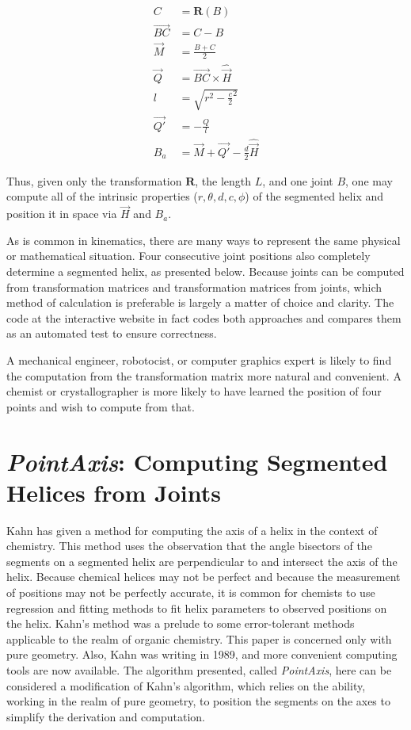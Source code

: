 \documentclass[11pt]{article}
\begin{document}
{\begin{align}
  C &= \bm{R}(B) \\
  \overrightarrow{BC} &= C - B\\
  \overrightarrow{M} &= \frac{B + C}{2} \\
  \overrightarrow{Q} &= \overrightarrow{BC} \times \hat{\overrightarrow{H}} \\
  l &= \sqrt{r^2 - \frac{c}{2}^2} \\
  \overrightarrow{Q'} &= -\frac{Q}{l} \\
  B_a &= \overrightarrow{M} + \overrightarrow{Q'} - \frac{d}{2}\hat{\overrightarrow{H}}
\end{align}

Thus, given only the transformation $\bm{R}$, the length $L$, and one
joint $B$, one may compute all of the intrinsic properties
($r,\theta,d,c,\phi$) of
the segmented helix and position it in space via $\overrightarrow{H}$ and $B_a$.

As is common in kinematics\cite{funda1990computational}, there are many ways to represent
the same physical or mathematical situation.
Four consecutive joint positions also completely determine a segmented helix, as presented below.
Because joints can be computed from transformation
matrices and transformation matrices from joints,
which method of calculation is preferable is largely
a matter of choice and clarity.
The code at the interactive website
in fact codes both approaches and compares them as an automated test to ensure
correctness.

A mechanical engineer, robotocist, or computer graphics expert is
likely to find the computation from the
transformation matrix more natural and convenient.
A chemist or crystallographer is more likely to
have learned the position of four points and wish to compute from that.

\section{{\em PointAxis}: Computing Segmented Helices from Joints}
\label{sec:pointaxis}

Kahn\cite{kahn1989defining} has given a method for computing
the axis of a helix in the context of chemistry.
This method uses the observation that the angle bisectors
of the segments on a segmented helix are perpendicular to
and intersect the axis of the helix.
Because chemical helices may not be perfect and because the measurement of positions may not be perfectly accurate,
it is common for chemists to use regression and fitting methods to fit helix parameters to observed positions
on the helix.
Kahn's method was a prelude to some error-tolerant methods applicable to
the realm of organic chemistry.
This paper is concerned only with pure geometry. Also, Kahn was writing in 1989,
and more convenient computing tools are now available.
The algorithm presented, called {\em PointAxis}, here can be considered a modification of Kahn's algorithm,
which relies on the ability, working in the realm of pure geometry, to position the segments on the axes
to simplify the derivation and computation.

}
\end{document}

